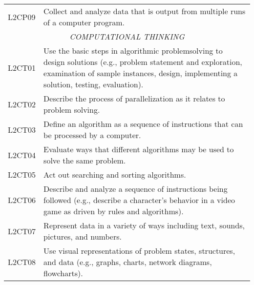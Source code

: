 \begin{longtable}{p{1.8cm}p{11cm}}
 L2CP09  & Collect and analyze data that is output from multiple runs of a computer program.                                                                                                                                          \\
 \multicolumn{2}{c}{\textit{COMPUTATIONAL THINKING}}                                                                                                                                                                                                     \\
 L2CT01  & Use the basic steps in algorithmic problemsolving to design solutions (e.g., problem statement and exploration, examination of sample instances, design, implementing a solution, testing, evaluation).                    \\
 L2CT02  & Describe the process of parallelization as it relates to problem solving.                                                                                                                                                  \\
 L2CT03  & Define an algorithm as a sequence of instructions that can be processed by a computer.                                                                                                                                     \\
 L2CT04  & Evaluate ways that different algorithms may be used to solve the same problem.                                                                                                                                             \\
 L2CT05  & Act out searching and sorting algorithms.                                                                                                                                                                                  \\
 L2CT06  & Describe and analyze a sequence of instructions being followed (e.g., describe a character’s behavior in a video game as driven by rules and algorithms).                                                                  \\
 L2CT07  & Represent data in a variety of ways including text, sounds, pictures, and numbers.                                                                                                                                         \\
  L2CT08  & Use visual representations of problem states, structures, and data (e.g., graphs, charts, network diagrams, flowcharts).    \\

\end{longtable}
